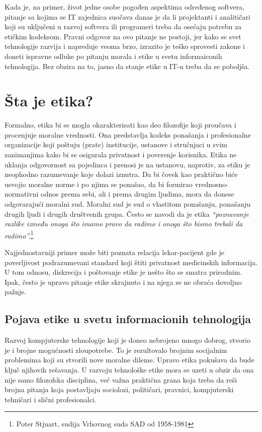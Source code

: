 \documentclass[a4paper]{article}
\begin{document}
{Kada je, na primer, život jedne osobe pogođen aspektima određenog softvera, pitanje sa kojima se IT zajednica suočava danas je da li projektanti i analitičari koji su uključeni u razvoj softvera ili programeri treba da osećaju potrebu za etičkim kodeksom.
Pravni odgovor na ovo pitanje ne postoji, jer kako se svet tehnologije razvija i napreduje veoma brzo, izrazito je teško sprovesti zakone i doneti ispravne odluke po pitanju morala i etike u svetu informaiconih tehnologija. Bez obzira na to, jasno da stanje etike u IT-u treba da se poboljša.

\section{Šta je etika?}

Formalno, etika bi se mogla okarakterisati kao deo filozofije koji pro\-u\-ča\-va i procenjuje moralne vrednosti. Ona predstavlja kodeks ponašanja i profesionalne organizacije koji poštuju (prate) institucije, ustanove i stručnjaci u svim zanimanjima kako bi se osigurala privatnost i poverenje korisnika. Etika ne uklanja odgovornost sa pojedinca i prenosi je na ustanovu, naprotiv, za etiku je neophodno razumevanje koje dolazi iznutra. Da bi čovek kao praktično biće usvojio moralne norme i po njima se ponašao, da bi formirao vrednosno-normativni odnos prema sebi, ali i prema drugim ljudima, mora da donese odgovarajući moralni sud. Moralni sud je sud o vlastitom ponašanju, ponašanju drugih ljudi i drugih društvenih grupa.\cite{Tavani}\cite{Illinois}
Često se navodi da je etika \emph{“poznavanje razlike između onoga što imamo pravo da radimo i onoga što bismo trebali da radimo”.}\footnote{Poter Stjuart, sudija Vrhovnog suda SAD od 1958-1981}

Najjednostavniji primer može biti poznata relacija lekar-pacijent gde je poverljivost podrazumevani standard koji štiti privatnost medicinskih informacija. U tom odnosu, diskrecija i poštovanje etike je nešto što se smatra prirodnim. Ipak, često je upravo pitanje etike skrajnuto i na njega se ne obraća dovoljno pažnje.

\subsection{Pojava etike u svetu informacionih tehnologija}

Razvoj kompjuterske tehnologije koji je doneo nebrojeno mnogo dobrog, stvorio je i brojne mogućnosti zloupotrebe. To je rezultovalo brojnim socijalnim problemima koji su stvorili nove moralne dileme. Upravo  etika pokušava da bude ključ njihovih rešavanja. U razvoju tehnološke etike mora se uzeti u obzir da ona nije samo filozofska disciplina, već važna praktična grana koja treba da reši brojna pitanja koja postavljaju sociolozi, političari, pravnici, kompjuterski tehničari i slični profesionalci\cite{Illinois}.

}
\end{document}
